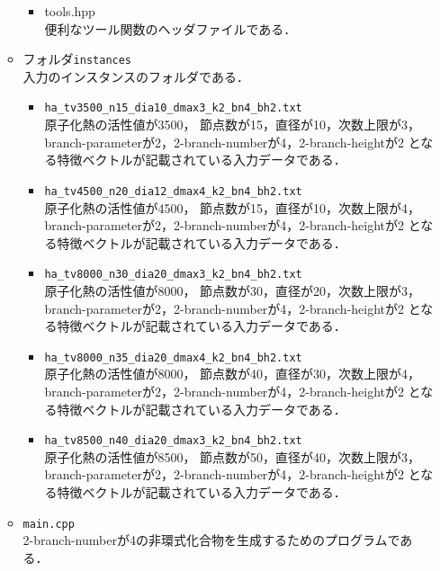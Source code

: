 \documentclass[11pt,titlepage,dvipdfmx,twoside]{jarticle}
\begin{document}
\begin{itemize}
\begin{itemize}
\begin{itemize}
			\item{tools.hpp}\\
				便利なツール関数のヘッダファイルである．						
		\end{itemize}
	\item フォルダ{\tt instances}\\
		入力のインスタンスのフォルダである．
		\begin{itemize}

			\item{\tt ha\_tv3500\_n15\_dia10\_dmax3\_k2\_bn4\_bh2.txt}\\
				原子化熱の活性値が3500，
				節点数が15，直径が10，次数上限が3，branch-parameterが2，2-branch-numberが4，2-branch-heightが2
				となる特徴ベクトルが記載されている入力データである．
				
			\item{\tt ha\_tv4500\_n20\_dia12\_dmax4\_k2\_bn4\_bh2.txt}\\
				原子化熱の活性値が4500，
				節点数が15，直径が10，次数上限が4，branch-parameterが2，2-branch-numberが4，2-branch-heightが2
				となる特徴ベクトルが記載されている入力データである．
				
			\item{\tt ha\_tv8000\_n30\_dia20\_dmax3\_k2\_bn4\_bh2.txt}\\
				原子化熱の活性値が8000，
				節点数が30，直径が20，次数上限が3，branch-parameterが2，2-branch-numberが4，2-branch-heightが2
				となる特徴ベクトルが記載されている入力データである．
				
			\item{\tt ha\_tv8000\_n35\_dia20\_dmax4\_k2\_bn4\_bh2.txt}\\
				原子化熱の活性値が8000，
				節点数が40，直径が30，次数上限が4，branch-parameterが2，2-branch-numberが4，2-branch-heightが2
				となる特徴ベクトルが記載されている入力データである．
				
			\item{\tt ha\_tv8500\_n40\_dia20\_dmax3\_k2\_bn4\_bh2.txt}\\
				原子化熱の活性値が8500，
				節点数が50，直径が40，次数上限が3，branch-parameterが2，2-branch-numberが4，2-branch-heightが2
				となる特徴ベクトルが記載されている入力データである．

		\end{itemize}
	\item {\tt main.cpp}\\
	2-branch-numberが4の非環式化合物を生成するためのプログラムである．
	\end{itemize}

\end{itemize}
\end{document}
